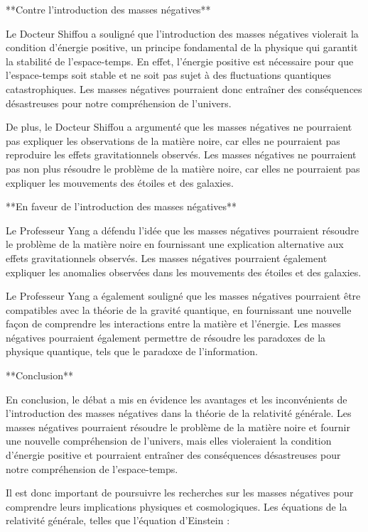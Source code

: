**Contre l'introduction des masses négatives**

Le Docteur Shiffou a souligné que l'introduction des masses négatives violerait la condition d'énergie positive, un principe fondamental de la physique qui garantit la stabilité de l'espace-temps. En effet, l'énergie positive est nécessaire pour que l'espace-temps soit stable et ne soit pas sujet à des fluctuations quantiques catastrophiques. Les masses négatives pourraient donc entraîner des conséquences désastreuses pour notre compréhension de l'univers.

De plus, le Docteur Shiffou a argumenté que les masses négatives ne pourraient pas expliquer les observations de la matière noire, car elles ne pourraient pas reproduire les effets gravitationnels observés. Les masses négatives ne pourraient pas non plus résoudre le problème de la matière noire, car elles ne pourraient pas expliquer les mouvements des étoiles et des galaxies.

**En faveur de l'introduction des masses négatives**

Le Professeur Yang a défendu l'idée que les masses négatives pourraient résoudre le problème de la matière noire en fournissant une explication alternative aux effets gravitationnels observés. Les masses négatives pourraient également expliquer les anomalies observées dans les mouvements des étoiles et des galaxies.

Le Professeur Yang a également souligné que les masses négatives pourraient être compatibles avec la théorie de la gravité quantique, en fournissant une nouvelle façon de comprendre les interactions entre la matière et l'énergie. Les masses négatives pourraient également permettre de résoudre les paradoxes de la physique quantique, tels que le paradoxe de l'information.

**Conclusion**

En conclusion, le débat a mis en évidence les avantages et les inconvénients de l'introduction des masses négatives dans la théorie de la relativité générale. Les masses négatives pourraient résoudre le problème de la matière noire et fournir une nouvelle compréhension de l'univers, mais elles violeraient la condition d'énergie positive et pourraient entraîner des conséquences désastreuses pour notre compréhension de l'espace-temps.

Il est donc important de poursuivre les recherches sur les masses négatives pour comprendre leurs implications physiques et cosmologiques. Les équations de la relativité générale, telles que l'équation d'Einstein :

